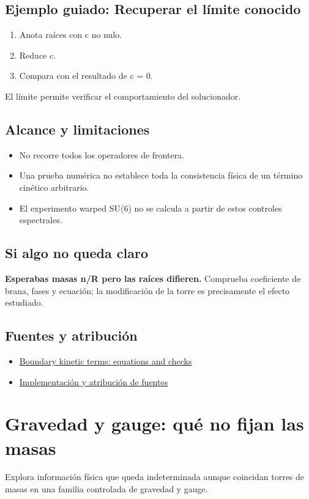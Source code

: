 \documentclass[11pt,a4paper]{article}
\begin{document}
\subsection*{Ejemplo guiado: Recuperar el límite conocido}
\begin{enumerate}
\item Anota raíces con c no nulo.
\item Reduce c.
\item Compara con el resultado de c = 0.
\end{enumerate}
El límite permite verificar el comportamiento del solucionador.
\subsection*{Alcance y limitaciones}
\begin{itemize}
\item No recorre todos los operadores de frontera.
\item Una prueba numérica no establece toda la consistencia física de un término cinético arbitrario.
\item El experimento warped SU(6) no se calcula a partir de estos controles espectrales.
\end{itemize}
\subsection*{Si algo no queda claro}
\textbf{Esperabas masas n/R pero las raíces difieren.} Comprueba coeficiente de brana, fases y ecuación; la modificación de la torre es precisamente el efecto estudiado.

\subsection*{Fuentes y atribución}
\begin{itemize}
\item \href{https://github.com/karlesmarin/ghu-lab/blob/main/src/kernel/blkt.mjs}{Boundary kinetic terms: equations and checks}
\item \href{https://github.com/karlesmarin/ghu-lab/blob/main/src/sections/blkt_section.js}{Implementación y atribución de fuentes}
\end{itemize}
\section{Gravedad y gauge: qué no fijan las masas}
Explora información física que queda indeterminada aunque coincidan torres de masas en una familia controlada de gravedad y gauge.
\end{document}
